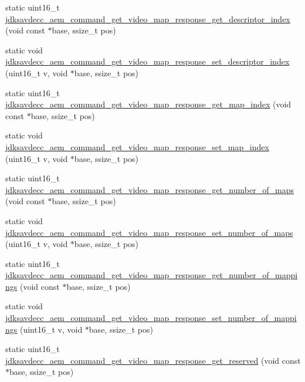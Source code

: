 \begin{DoxyCompactItemize}
\item 
static uint16\+\_\+t \hyperlink{group__command__get__video__map__response_ga5274f3ec8fc2f308ccda8ca3515dec34}{jdksavdecc\+\_\+aem\+\_\+command\+\_\+get\+\_\+video\+\_\+map\+\_\+response\+\_\+get\+\_\+descriptor\+\_\+index} (void const $\ast$base, ssize\+\_\+t pos)
\item 
static void \hyperlink{group__command__get__video__map__response_ga7abc0d7d427021377ea3aba41e8e761b}{jdksavdecc\+\_\+aem\+\_\+command\+\_\+get\+\_\+video\+\_\+map\+\_\+response\+\_\+set\+\_\+descriptor\+\_\+index} (uint16\+\_\+t v, void $\ast$base, ssize\+\_\+t pos)
\item 
static uint16\+\_\+t \hyperlink{group__command__get__video__map__response_ga8e858b1e262cdc86268f7dda3a1b860d}{jdksavdecc\+\_\+aem\+\_\+command\+\_\+get\+\_\+video\+\_\+map\+\_\+response\+\_\+get\+\_\+map\+\_\+index} (void const $\ast$base, ssize\+\_\+t pos)
\item 
static void \hyperlink{group__command__get__video__map__response_ga15c73e7db0d0f88dcc0aef95caf339e0}{jdksavdecc\+\_\+aem\+\_\+command\+\_\+get\+\_\+video\+\_\+map\+\_\+response\+\_\+set\+\_\+map\+\_\+index} (uint16\+\_\+t v, void $\ast$base, ssize\+\_\+t pos)
\item 
static uint16\+\_\+t \hyperlink{group__command__get__video__map__response_ga8e9396b67e16b4b4eedcbb4c1ef4636e}{jdksavdecc\+\_\+aem\+\_\+command\+\_\+get\+\_\+video\+\_\+map\+\_\+response\+\_\+get\+\_\+number\+\_\+of\+\_\+maps} (void const $\ast$base, ssize\+\_\+t pos)
\item 
static void \hyperlink{group__command__get__video__map__response_ga645f60d377bf0ecf95f5b19eef976f29}{jdksavdecc\+\_\+aem\+\_\+command\+\_\+get\+\_\+video\+\_\+map\+\_\+response\+\_\+set\+\_\+number\+\_\+of\+\_\+maps} (uint16\+\_\+t v, void $\ast$base, ssize\+\_\+t pos)
\item 
static uint16\+\_\+t \hyperlink{group__command__get__video__map__response_gad8afdd4a551ad08ed2c587bb828456f8}{jdksavdecc\+\_\+aem\+\_\+command\+\_\+get\+\_\+video\+\_\+map\+\_\+response\+\_\+get\+\_\+number\+\_\+of\+\_\+mappings} (void const $\ast$base, ssize\+\_\+t pos)
\item 
static void \hyperlink{group__command__get__video__map__response_gacf1259318af49d11b5f7f038c0f55455}{jdksavdecc\+\_\+aem\+\_\+command\+\_\+get\+\_\+video\+\_\+map\+\_\+response\+\_\+set\+\_\+number\+\_\+of\+\_\+mappings} (uint16\+\_\+t v, void $\ast$base, ssize\+\_\+t pos)
\item 
static uint16\+\_\+t \hyperlink{group__command__get__video__map__response_ga897f07dac2c5d29f6e895500c3c122ff}{jdksavdecc\+\_\+aem\+\_\+command\+\_\+get\+\_\+video\+\_\+map\+\_\+response\+\_\+get\+\_\+reserved} (void const $\ast$base, ssize\+\_\+t pos)

\end{DoxyCompactItemize}
